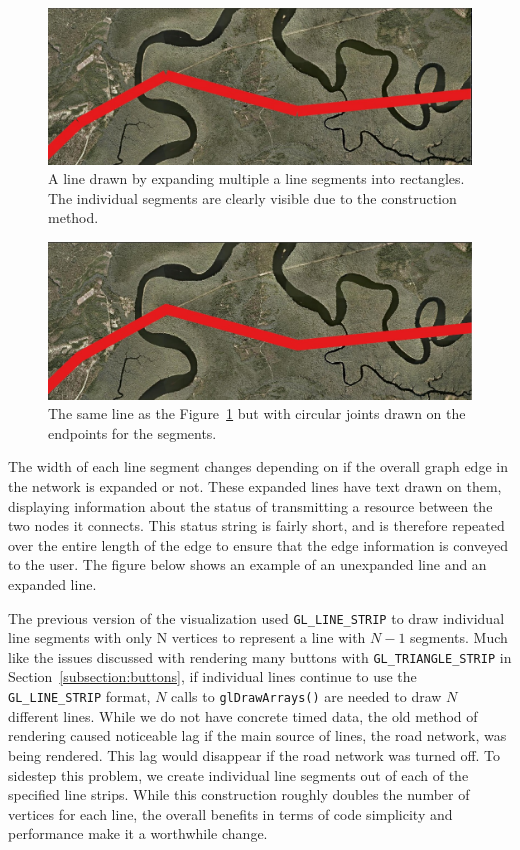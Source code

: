 \begin{figure}[htp]
    \centering
    \includegraphics[width=0.90\linewidth]{img/expanded_edge_no_joint.jpg}
    \caption[Line Segment without Joints Drawn]{A line drawn by expanding multiple a line segments into rectangles. The individual segments are clearly visible due to the construction method.}
    \label{fig:line_no_joint}
\end{figure}
\begin{figure}[htp]
    \centering
    \includegraphics[width=0.90\linewidth]{img/expanded_edge_joint.jpg}
    \caption[Line Segments with Joints Drawn]{The same line as the Figure~\ref{fig:line_no_joint} but with circular joints drawn on the endpoints for the segments.}
    \label{fig:line_joint}
\end{figure}

The width of each line segment changes depending on if the overall graph edge in the network is expanded or not. These expanded lines have text drawn on them, displaying information about the status of transmitting a resource between the two nodes it connects. This status string is fairly short, and is therefore repeated over the entire length of the edge to ensure that the edge information is conveyed to the user. The figure below shows an example of an unexpanded line and an expanded line.

The previous version of the visualization used {\tt GL\_LINE\_STRIP} to draw individual line segments with only 
N vertices to represent a line with $N-1$ segments. Much like the issues discussed with rendering 
many buttons with {\tt GL\_TRIANGLE\_STRIP} in Section~\ref{subsection:buttons}, if individual lines continue to 
use the  {\tt GL\_LINE\_STRIP} format, $N$ calls to {\tt glDrawArrays()} are needed to draw $N$ different lines. While we do not have concrete timed data, the old method of rendering caused noticeable lag if the main source of lines, the road network, was being rendered. This lag would disappear if the road network was turned off. To sidestep 
this problem, we create individual line segments out of each of the specified line strips. 
While this construction roughly doubles the number of vertices for each line, the overall benefits 
in terms of code simplicity and performance make it a worthwhile change.

